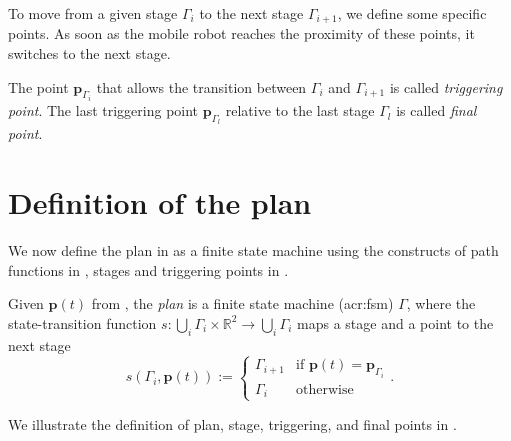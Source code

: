To move from a given stage $\Gamma_i$ to the next stage $\Gamma_{i+1}$, we define some specific points. As soon as the mobile robot reaches the proximity of these points, it switches to the next stage.

\begin{highlight}  
  \begin{defn}\label{def:trigs}
    The point $\mathbf{p}_{\Gamma_{i}}$ that allows the transition between $\Gamma_i$ and $\Gamma_{i+1}$ is called \emph{triggering point}. The last triggering point $\mathbf{p}_{\Gamma_{l}}$ relative to the last stage $\Gamma_l$ is called \emph{final point}.
  \end{defn}
\end{highlight}


\section{Definition of the plan}
\label{sec:plan}

We now define the plan in  as a finite state machine using the constructs of path functions in , stages and triggering points in .

\begin{highlight}  
  \begin{defn}[Plan]\label{def:plan}
    Given $\mathbf{p}(t)$ from , the \emph{plan} is a finite state machine (\Gls{acr:fsm}) $\Gamma$, where the state-transition function $s:\bigcup_i{\Gamma_i}\times\mathbb{R}^2\rightarrow\bigcup_i{\Gamma_i}$ maps a stage and a point to the next stage
    \begin{equation*}s(\Gamma_i,\mathbf{p}(t)):=\begin{cases}
      \Gamma_{i+1} & \text{if }\mathbf{p}(t)=\mathbf{p}_{\Gamma_i}\\
      \Gamma_i & \text{otherwise}
    \end{cases}.\end{equation*}
  \end{defn}
\end{highlight}

We illustrate the definition of plan, stage, triggering, and final points in .

